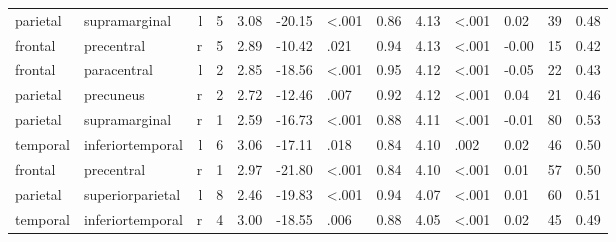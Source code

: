 \documentclass{article}
\begin{document}
\begin{longtable}{llrR{1.3cm}R{1cm}R{1.3cm}R{1cm}R{1cm}R{1.3cm}R{1cm}R{1.8cm}R{1.3cm}R{1.8cm}}
  parietal &             supramarginal &    l &         5 &                  3.08 &           -20.15 &      \textless.001 &                               0.86 &                          4.13 &                   \textless.001 &   0.02 &     39 &      0.48 \\
   frontal &                precentral &    r &         5 &                  2.89 &           -10.42 &               .021 &                               0.94 &                          4.13 &                   \textless.001 &  -0.00 &     15 &      0.42 \\
   frontal &               paracentral &    l &         2 &                  2.85 &           -18.56 &      \textless.001 &                               0.95 &                          4.12 &                   \textless.001 &  -0.05 &     22 &      0.43 \\
  parietal &                 precuneus &    r &         2 &                  2.72 &           -12.46 &               .007 &                               0.92 &                          4.12 &                   \textless.001 &   0.04 &     21 &      0.46 \\
  parietal &             supramarginal &    r &         1 &                  2.59 &           -16.73 &      \textless.001 &                               0.88 &                          4.11 &                   \textless.001 &  -0.01 &     80 &      0.53 \\
  temporal &          inferiortemporal &    l &         6 &                  3.06 &           -17.11 &               .018 &                               0.84 &                          4.10 &                            .002 &   0.02 &     46 &      0.50 \\
   frontal &                precentral &    r &         1 &                  2.97 &           -21.80 &      \textless.001 &                               0.84 &                          4.10 &                   \textless.001 &   0.01 &     57 &      0.50 \\
  parietal &          superiorparietal &    l &         8 &                  2.46 &           -19.83 &      \textless.001 &                               0.94 &                          4.07 &                   \textless.001 &   0.01 &     60 &      0.51 \\
  temporal &          inferiortemporal &    r &         4 &                  3.00 &           -18.55 &               .006 &                               0.88 &                          4.05 &                   \textless.001 &   0.02 &     45 &      0.49 \\

\end{longtable}
\end{document}
